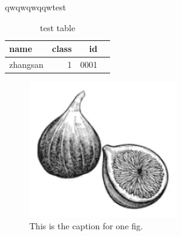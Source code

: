 \documentclass[journal]{IEEEtran}
\begin{document}


qwqwqwqqwtest\cite{12345}

\begin{table}
\centering
\caption{test table}
\begin{tabular}{p{15.1em}|r|r|r}
\hline
name & class & id\\
\hline
zhangsan & 1 & 0001\\
\end{tabular}
\end{table}

\begin{figure}[!t]
\centering
\includegraphics[width=2.5in]{fig1.png}
\caption{This is the caption for one fig.}
\label{fig1}
\end{figure}




\end{document}
